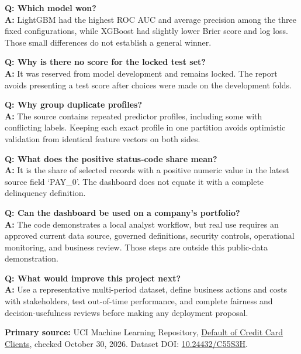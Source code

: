 \documentclass[11pt,letterpaper]{article}
\begin{document}
\textbf{Q: Which model won?}\\
\textbf{A:} LightGBM had the highest ROC AUC and average precision among the three fixed configurations, while XGBoost had slightly lower Brier score and log loss. Those small differences do not establish a general winner.

\textbf{Q: Why is there no score for the locked test set?}\\
\textbf{A:} It was reserved from model development and remains locked. The report avoids presenting a test score after choices were made on the development folds.

\textbf{Q: Why group duplicate profiles?}\\
\textbf{A:} The source contains repeated predictor profiles, including some with conflicting labels. Keeping each exact profile in one partition avoids optimistic validation from identical feature vectors on both sides.

\textbf{Q: What does the positive status-code share mean?}\\
\textbf{A:} It is the share of selected records with a positive numeric value in the latest source field `PAY\_0'. The dashboard does not equate it with a complete delinquency definition.

\textbf{Q: Can the dashboard be used on a company's portfolio?}\\
\textbf{A:} The code demonstrates a local analyst workflow, but real use requires an approved current data source, governed definitions, security controls, operational monitoring, and business review. Those steps are outside this public-data demonstration.

\textbf{Q: What would improve this project next?}\\
\textbf{A:} Use a representative multi-period dataset, define business actions and costs with stakeholders, test out-of-time performance, and complete fairness and decision-usefulness reviews before making any deployment proposal.

\vfill
\small\textbf{Primary source:} UCI Machine Learning Repository, \href{https://archive.ics.uci.edu/dataset/350/default+of+credit+card+clients}{Default of Credit Card Clients}, checked October 30, 2026. Dataset DOI: \href{https://doi.org/10.24432/C55S3H}{10.24432/C55S3H}.\par
\end{document}
